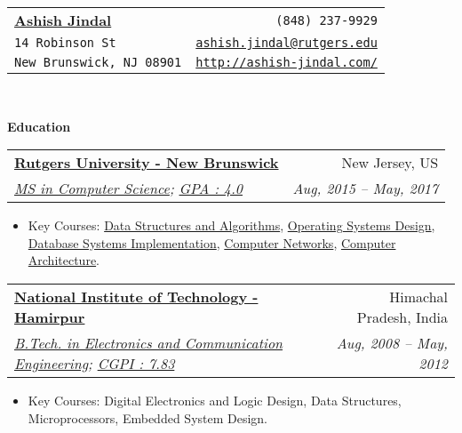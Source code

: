 \documentclass[letterpaper,11pt]{article}
\makeatletter
\newcommand{\resitem}[1]{\item #1 \vspace{2pt}}
\newcommand{\resheading}[1]{{\large \colorbox{mygrey}{\begin{minipage}{\textwidth}{\textbf{#1 \vphantom{p\^{E}}}}\end{minipage}}}\vspace{6pt}}
\newcommand{\ressubheading}[4]{
\begin{tabular*}{7in}{l@{\extracolsep{\fill}}r}
		\textbf{#1} & #2 \\
		\textit{#3} & \textit{#4} \\
\end{tabular*}\vspace{-3pt}}
\makeatother
\begin{document}
\newcommand{\mywebheader}{
\begin{tabular*}{7in}{l@{\extracolsep{\fill}}r}
	\textbf{\href{http://www.ashish-jindal.com/}{\LARGE Ashish Jindal}} & {\footnotesize \texttt{(848) 237-9929}}\\
	{\footnotesize \texttt{14 Robinson St}} & {\footnotesize \texttt{\href{mailto:ashish.jindal@rutgers.edu}{ashish.jindal@rutgers.edu}}}\\
	 {\footnotesize \texttt{New Brunswick, NJ 08901}} & {\footnotesize \texttt{\href{http://www.ashish-jindal.com/}{http://ashish-jindal.com/}}} \\
	\end{tabular*}
\\
\vspace{0.1in}}

\mywebheader

\resheading{Education}
			\ressubheading{\href{http://www.rutgers.edu/}{Rutgers University - New Brunswick}}{New Jersey, US}{\href{https://www.cs.rutgers.edu/}{MS in Computer Science}; \href{http://www.ashish-jindal.com/rutgers_unofficial_transcript.pdf}{GPA : 4.0}}{Aug, 2015 -- May, 2017}
				{ \footnotesize
				\begin{itemize}
					\resitem{Key Courses: \href{https://www.cs.rutgers.edu/graduate/courses/512/}{Data Structures and Algorithms}, \href{https://www.cs.rutgers.edu/graduate/courses/518/}{Operating Systems Design}, \href{https://www.cs.rutgers.edu/graduate/courses/539/}{Database Systems Implementation}, \href{https://www.cs.rutgers.edu/graduate/courses/552/}{Computer Networks}, \href{https://www.cs.rutgers.edu/graduate/courses/505/}{Computer Architecture}.}
				\end{itemize}
				}


			\ressubheading{\href{http://www.nith.ac.in/}{National Institute of Technology - Hamirpur}}{Himachal Pradesh, India}{\href{http://www.nith.ac.in/ece/}{B.Tech. in Electronics and Communication Engineering}; \href{http://www.ashish-jindal.com/nith_unofficial_transcript.pdf}{CGPI : 7.83}}{Aug, 2008 -- May, 2012}
				{ \footnotesize
				\begin{itemize}
					\resitem{Key Courses: Digital Electronics and Logic Design, Data Structures, Microprocessors, Embedded System Design.}
					
				\end{itemize}
				}
\end{document}

